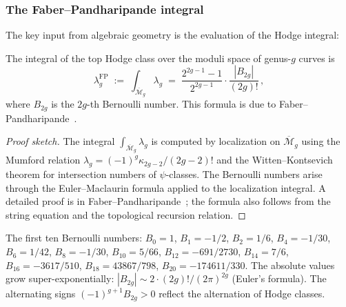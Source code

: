 \subsubsection{The Faber--Pandharipande integral}

The key input from algebraic geometry is the evaluation of the Hodge integral:

\begin{proposition}
\label{prop:thqg-I-faber-pandharipande}
The integral of the top Hodge class over the moduli space of genus-$g$ curves is
\begin{equation}%
\lambda_g^{\mathrm{FP}} \;:=\; \int_{\overline{\mathcal{M}}_g} \lambda_g \;=\; \frac{2^{2g-1} - 1}{2^{2g-1}} \cdot \frac{|B_{2g}|}{(2g)!}\,,
\end{equation}
where $B_{2g}$ is the $2g$-th Bernoulli number. This formula is due to Faber--Pandharipande~\cite{FP00}.
\end{proposition}

\begin{proof}[Proof sketch]
The integral $\int_{\overline{\mathcal{M}}_g} \lambda_g$ is computed by localization on $\overline{\mathcal{M}}_g$ using the Mumford relation $\lambda_g = (-1)^g \kappa_{2g-2}/(2g-2)!$ and the Witten--Kontsevich theorem for intersection numbers of $\psi$-classes. The Bernoulli numbers arise through the Euler--Maclaurin formula applied to the localization integral. A detailed proof is in Faber--Pandharipande~\cite{FP00}; the formula also follows from the string equation and the topological recursion relation.
\end{proof}

\begin{remark}
The first ten Bernoulli numbers: $B_0 = 1$, $B_1 = -1/2$, $B_2 = 1/6$, $B_4 = -1/30$, $B_6 = 1/42$, $B_8 = -1/30$, $B_{10} = 5/66$, $B_{12} = -691/2730$, $B_{14} = 7/6$, $B_{16} = -3617/510$, $B_{18} = 43867/798$, $B_{20} = -174611/330$. The absolute values grow super-exponentially: $|B_{2g}| \sim 2 \cdot (2g)! / (2\pi)^{2g}$ (Euler's formula). The alternating signs $(-1)^{g+1} B_{2g} > 0$ reflect the alternation of Hodge classes.
\end{remark}

